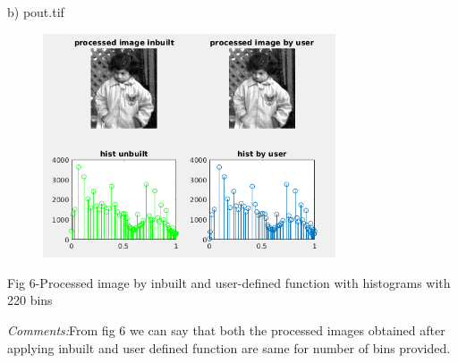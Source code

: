 \documentclass[12pt]{article}
\begin{document}
\vspace{\baselineskip}
\begin{justify}
\tab b) pout.tif\tab \tab 
\end{justify}\par


\vspace{\baselineskip}



\begin{figure}[H]
	\begin{Center}
		\includegraphics[width=3.41in,height=2.61in]{./media/image7.png}
	\end{Center}
\end{figure}



\par

\begin{adjustwidth}{1.0in}{0.0in}
\begin{Center}
Fig 6-Processed image by inbuilt and user-defined function with histograms with 220 bins
\end{Center}\par

\end{adjustwidth}


\vspace{\baselineskip}
\begin{adjustwidth}{1.0in}{0.0in}
\begin{justify}
\textit{Comments:}From fig 6 we can say that both the processed images obtained after applying inbuilt and user defined function are same for number of bins provided.
\end{justify}\par

\end{adjustwidth}
\end{document}
